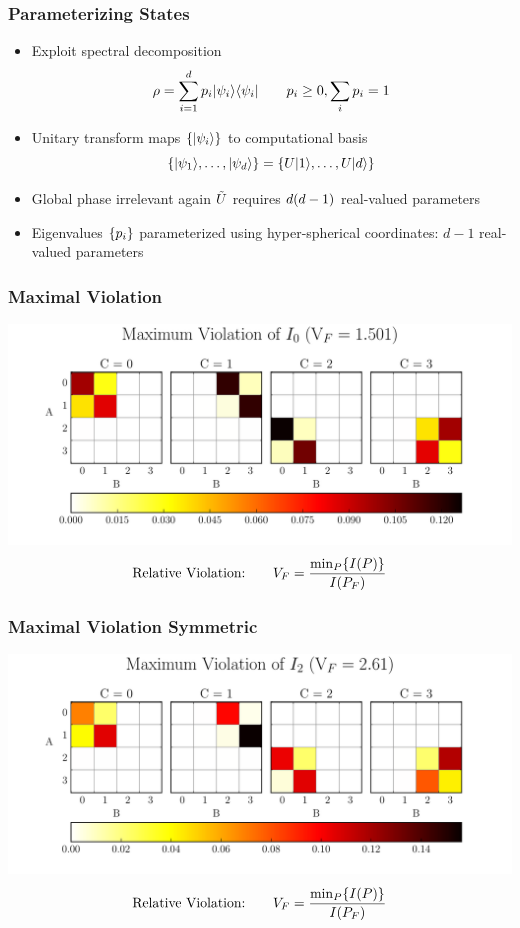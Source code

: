 \documentclass[
    hyperref={bookmarks=false},%
    xcolor={dvipsnames},
]{beamer}
\begin{document}
\begin{frame}
    \frametitle{Parameterizing States}
    \begin{itemize}
        \item Exploit spectral decomposition
        \[ \rho = \sum_{i=1}^{d} p_i \ket{\psi_i} \bra{\psi_i} \qquad p_i \geq 0, \sum_i p_i = 1 \]
        \item Unitary transform maps $\bc{\ket{\psi_i}}$ to computational basis
        \[ \bc{\ket{\psi_{1}}, \ldots, \ket{\psi_{d}}} = \bc{U \ket{1}, \ldots, U \ket{d}} \]
        \item Global phase irrelevant again $\tilde{U}\hspace{0pt}$ requires $d\br{d - 1}$ real-valued parameters
        \item Eigenvalues $\bc{p_i}$ parameterized using hyper-spherical coordinates: $d - 1$ real-valued parameters
    \end{itemize}
\end{frame}

\begin{frame}
    \frametitle{Maximal Violation}
    \includegraphics[width=\linewidth]{../../figures/distributions/plotted_dist_I_0_max_violation.pdf}
    \[ \text{Relative Violation:} \qquad V_F = \f{\min_P\bc{I\br{P}}}{I\br{P_F}} \]
\end{frame}

\begin{frame}
    \frametitle{Maximal Violation Symmetric}
    \includegraphics[width=\linewidth]{../../figures/distributions/plotted_dist_I_2_max_violation.pdf}
    \[ \text{Relative Violation:} \qquad V_F = \f{\min_P\bc{I\br{P}}}{I\br{P_F}} \]
\end{frame}
\end{document}

